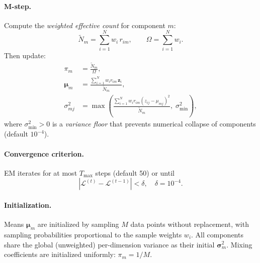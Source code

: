 \documentclass[12pt,a4paper]{article}
\begin{document}
\paragraph{M-step.} Compute the \emph{weighted effective count} for component $m$:
\begin{equation}
    \tilde{N}_m = \sum_{i=1}^N w_i \, r_{im}, \qquad \Omega = \sum_{i=1}^N w_i.
    \label{eq:Nk}
\end{equation}
Then update:
\begin{align}
    \pi_m &= \frac{\tilde{N}_m}{\Omega}, \label{eq:pi_update} \\[4pt]
    \bm{\mu}_m &= \frac{\sum_{i=1}^N w_i r_{im} \, \mathbf{z}_i}{\tilde{N}_m}, \label{eq:mu_update} \\[4pt]
    \sigma_{mj}^2 &= \max\!\left(\frac{\sum_{i=1}^N w_i r_{im}(z_{ij}-\mu_{mj})^2}{\tilde{N}_m},\; \sigma^2_{\min}\right), \label{eq:var_update}
\end{align}
where $\sigma^2_{\min} > 0$ is a \emph{variance floor} that prevents numerical collapse of components (default $10^{-4}$).

\paragraph{Convergence criterion.} EM iterates for at most $T_{\max}$ steps (default 50) or until
\begin{equation}
    \left|\mathcal{L}^{(t)} - \mathcal{L}^{(t-1)}\right| < \delta, \quad \delta = 10^{-4}.
    \label{eq:conv}
\end{equation}

\paragraph{Initialization.} Means $\bm{\mu}_m$ are initialized by sampling $M$ data points without replacement, with sampling probabilities proportional to the sample weights $w_i$.
All components share the global (unweighted) per-dimension variance as their initial $\bm{\sigma}_m^2$.
Mixing coefficients are initialized uniformly: $\pi_m = 1/M$.
\end{document}
